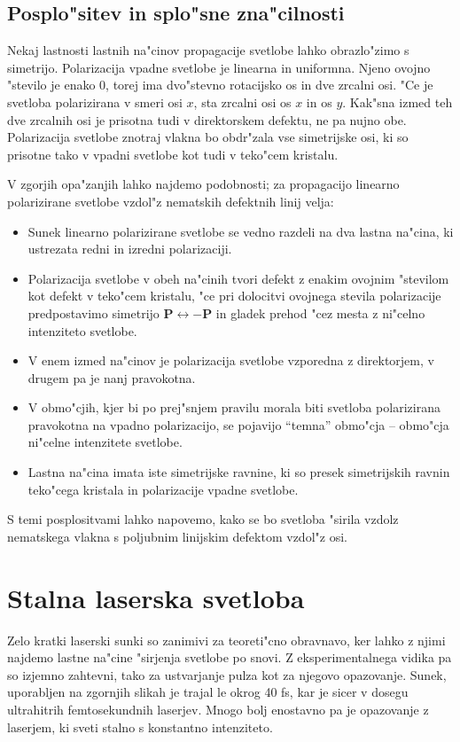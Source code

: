 \documentclass[12pt,twoside,openright,final]{report}
\renewcommand{\vec}{\mathbf}
\begin{document}
\section{Posplo"sitev in splo"sne zna"cilnosti}
Nekaj lastnosti lastnih na"cinov propagacije svetlobe lahko obrazlo"zimo s simetrijo. 
Polarizacija vpadne svetlobe je linearna in uniformna. 
Njeno ovojno "stevilo je enako 0, torej ima dvo"stevno rotacijsko os in dve zrcalni osi. 
"Ce je svetloba polarizirana v smeri osi $x$, sta zrcalni osi os $x$ in os $y$. 
Kak"sna izmed teh dve zrcalnih osi je prisotna tudi v direktorskem defektu, ne pa nujno obe. 
Polarizacija svetlobe znotraj vlakna bo obdr"zala vse simetrijske osi, ki so prisotne tako v vpadni svetlobe kot tudi v teko"cem kristalu. 

V zgorjih opa"zanjih lahko najdemo podobnosti; za propagacijo linearno polarizirane svetlobe vzdol"z nematskih defektnih linij velja:
\begin{itemize}
 \item Sunek linearno polarizirane svetlobe se vedno razdeli na dva lastna na"cina, ki ustrezata redni in izredni polarizaciji.
 \item Polarizacija svetlobe v obeh na"cinih tvori defekt z enakim ovojnim "stevilom kot defekt v teko"cem kristalu, "ce pri dolocitvi ovojnega stevila polarizacije predpostavimo simetrijo $\vec P \leftrightarrow -\vec P$ in gladek prehod "cez mesta z ni"celno intenziteto svetlobe. 
 \item V enem izmed na"cinov je polarizacija svetlobe vzporedna z direktorjem, v drugem pa je nanj pravokotna.
 \item V obmo"cjih, kjer bi po prej"snjem pravilu morala biti svetloba polarizirana pravokotna na vpadno polarizacijo, se pojavijo ``temna'' obmo"cja -- obmo"cja ni"celne intenzitete svetlobe.
 \item Lastna na"cina imata iste simetrijske ravnine, ki so presek simetrijskih ravnin teko"cega kristala in polarizacije vpadne svetlobe. 
\end{itemize}

S temi posplositvami lahko napovemo, kako se bo svetloba "sirila vzdolz nematskega vlakna s poljubnim linijskim defektom vzdol"z osi. 

\chapter{Stalna laserska svetloba}

Zelo kratki laserski sunki so zanimivi za teoreti"cno obravnavo, ker lahko z njimi najdemo lastne na"cine "sirjenja svetlobe po snovi. 
Z eksperimentalnega vidika pa so izjemno zahtevni, tako za ustvarjanje pulza kot za njegovo opazovanje. 
Sunek, uporabljen na zgornjih slikah je trajal le okrog 40 fs, kar je sicer v dosegu ultrahitrih femtosekundnih laserjev. 
Mnogo bolj enostavno pa je opazovanje z laserjem, ki sveti stalno s konstantno intenziteto. 
\end{document}
